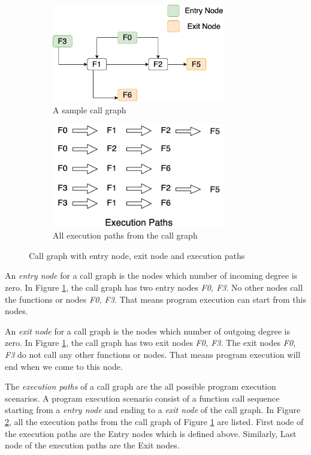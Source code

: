 \begin{figure}[h]	
	\centering
	\begin{subfigure}[h]{3in}
	\includegraphics[width=3in]{figures/background/call graph.png}
	\caption{A sample call graph}\label{fig:bg_call_graph}		
	\end{subfigure}
	\quad
	\begin{subfigure}[h]{3in}
		\includegraphics[width=3in]{figures/background/execution_paths.png}
		\caption{All execution paths from the call graph}\label{fig:bg_execution_path}
	\end{subfigure}
	\caption{Call graph with entry node, exit node and execution paths}\label{fig:1}
\end{figure}

An \emph{entry node} for a call graph is the nodes which number of incoming degree is zero. In Figure \ref{fig:bg_call_graph}, the call graph has two entry nodes \emph{F0, F3}. No other nodes call the functions or nodes \emph{F0, F3}. That means program execution can start from this nodes.

An \emph{exit node} for a call graph is the nodes which number of outgoing degree is zero. In Figure \ref{fig:bg_call_graph}, the call graph has two exit nodes \emph{F0, F3}. The exit nodes \emph{F0, F3} do not call any other functions or nodes. That means program execution will end when we come to this node.


The \emph{execution paths} of a call graph are the all possible program execution scenarios. A program execution scenario consist of a function call sequence starting from a \emph{entry node} and ending to a \emph{exit node} of the call graph. In Figure \ref{fig:bg_execution_path}, all the execution paths from the call graph of Figure \ref{fig:bg_call_graph} are listed. First node of the execution paths are the Entry nodes which is defined above. Similarly, Last node of the execution paths are the Exit nodes. 




